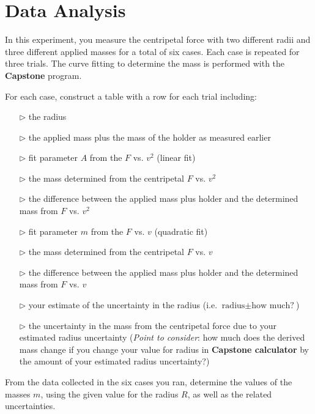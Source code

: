 \section{Data Analysis}

In this experiment, you measure the centripetal force with two different radii and three different applied masses for a total of six cases.
Each case is repeated for three trials.
The curve fitting to determine the mass is performed with the \textbf{Capstone} program.

For each case, construct a table with a row for each trial including:
\begin{itemize}
\item[$\triangleright$] the radius
\item[$\triangleright$] the applied mass plus the mass of the holder as measured earlier
\item[$\triangleright$] fit parameter $A$ from the $F$ vs. $v^2$ (linear fit)
\item[$\triangleright$] the mass determined from the centripetal $F$ vs. $v^2$
\item[$\triangleright$] the difference between the applied mass plus holder and the determined mass from $F$ vs. $v^2$
\item[$\triangleright$] fit parameter $m$ from the $F$ vs. $v$ (quadratic fit)
\item[$\triangleright$] the mass determined from the centripetal $F$ vs. $v$
\item[$\triangleright$] the difference between the applied mass plus holder and the determined mass from $F$ vs. $v$
\item[$\triangleright$] your estimate of the uncertainty in the radius (i.e. $\text{radius} \pm \text{how much?}$)
\item[$\triangleright$] the uncertainty in the mass from the centripetal force due to your estimated radius uncertainty (\textit{Point to consider}: how much does the derived mass change if you change your value for radius in \textbf{Capstone calculator} by the amount of your estimated radius uncertainty?)
\end{itemize}

From the data collected in the six cases you ran, determine the values of the masses $m$, using the given value for the radius $R$, as well as the related uncertainties.


